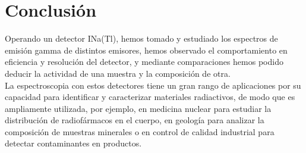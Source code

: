 \documentclass[a4paper,12pt,spanish]{article}
\begin{document}
	\section{Conclusión}
	
	
	Operando un detector INa(Tl), hemos tomado y estudiado los espectros de emisión gamma de distintos emisores, hemos observado el comportamiento en eficiencia y resolución del detector, y mediante comparaciones hemos podido deducir la actividad de una muestra y la composición de otra. \\
	
	La espectroscopia con estos detectores tiene un gran rango de aplicaciones por su capacidad para identificar y caracterizar materiales radiactivos, de modo que es ampliamente utilizada, por ejemplo, en medicina nuclear para estudiar la distribución de radiofármacos en el cuerpo, en geología para analizar la composición de muestras minerales o en control de calidad industrial para detectar contaminantes en productos.
	
	
	
\end{document}
